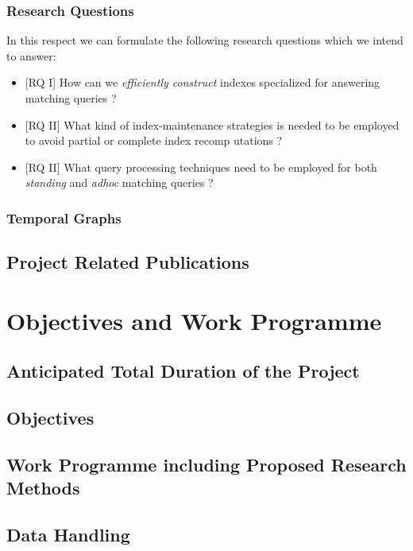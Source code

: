 \documentclass{scrartcl}
\begin{document}
\subsubsection{Research Questions} 	
In this respect we can formulate the following research questions which we intend to answer:
\begin{itemize}
	\item \textsf{[RQ I]} How can we \emph{efficiently construct} indexes specialized for answering matching queries ? 

	\item \textsf{[RQ II]} What kind of index-maintenance strategies is needed to be employed to avoid partial or complete index recomp utations ?

	\item \textsf{[RQ II]} What query processing techniques need to be employed for both \emph{standing} and \emph{adhoc} matching queries ?

\end{itemize}



\subsubsection {Temporal Graphs }

\subsection{Project Related Publications}

\section{Objectives and Work Programme}
\subsection{Anticipated Total Duration of the Project}
\subsection{Objectives}
\subsection{Work Programme including Proposed Research Methods}
\subsection{Data Handling}
\end{document}
